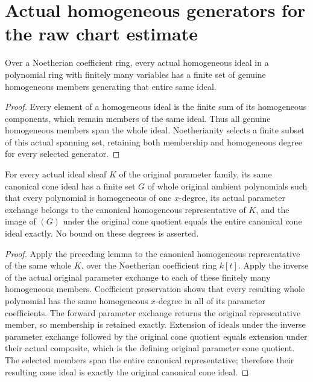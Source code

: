 \section{Actual homogeneous generators for the raw chart estimate}

\begin{lemma}
\label{lem:c0n-finite-homogeneous-whole-generators}
\leanok
Over a Noetherian coefficient ring, every actual homogeneous ideal in a
polynomial ring with finitely many variables has a finite set of genuine
homogeneous members generating that entire same ideal.
\end{lemma}
\begin{proof}
Every element of a homogeneous ideal is the finite sum of its homogeneous
components, which remain members of the same ideal.  Thus all genuine
homogeneous members span the whole ideal.  Noetherianity selects a finite
subset of this actual spanning set, retaining both membership and
homogeneous degree for every selected generator.
\end{proof}

\begin{lemma}
\label{lem:c0n-raw-canonical-cone-generators}
\leanok
For every actual ideal sheaf $K$ of the original parameter family, its
same canonical cone ideal has a finite set $G$ of whole original ambient
polynomials such that every polynomial is homogeneous of one $x$-degree,
its actual parameter exchange belongs to the canonical homogeneous
representative of $K$, and the image of $(G)$ under the original cone
quotient equals the entire canonical cone ideal exactly.
No bound on these degrees is asserted.
\end{lemma}
\begin{proof}
Apply the preceding lemma to the canonical homogeneous representative of
the same whole $K$, over the Noetherian coefficient ring $k[t]$.
Apply the inverse of the actual original parameter exchange to each of
these finitely many homogeneous members.  Coefficient preservation shows
that every resulting whole polynomial has the same homogeneous
$x$-degree in all of its parameter coefficients.
The forward parameter exchange returns the original representative
member, so membership is retained exactly.
Extension of ideals under the inverse parameter exchange followed by
the original cone quotient equals extension under their actual composite,
which is the defining original parameter cone quotient.
The selected members span the entire canonical representative; therefore
their resulting cone ideal is exactly the original canonical cone ideal.
\end{proof}
